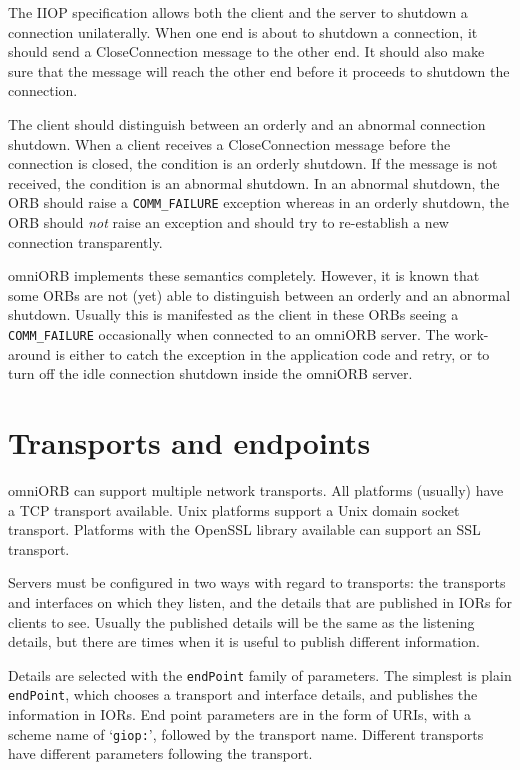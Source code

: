 \documentclass[11pt,twoside,a4paper]{book}
\newcommand{\code}[1]{\texttt{#1}}
\begin{document}
The IIOP specification allows both the client and the server to
shutdown a connection unilaterally. When one end is about to shutdown
a connection, it should send a CloseConnection message to the other
end. It should also make sure that the message will reach the other
end before it proceeds to shutdown the connection.

The client should distinguish between an orderly and an abnormal
connection shutdown. When a client receives a CloseConnection message
before the connection is closed, the condition is an orderly shutdown.
If the message is not received, the condition is an abnormal shutdown.
In an abnormal shutdown, the ORB should raise a \code{COMM\_FAILURE}
exception whereas in an orderly shutdown, the ORB should \emph{not}
raise an exception and should try to re-establish a new connection
transparently.

omniORB implements these semantics completely. However, it is known
that some ORBs are not (yet) able to distinguish between an orderly
and an abnormal shutdown. Usually this is manifested as the client in
these ORBs seeing a \code{COMM\_FAILURE} occasionally when connected
to an omniORB server. The work-around is either to catch the exception
in the application code and retry, or to turn off the idle connection
shutdown inside the omniORB server.



\section{Transports and endpoints}

omniORB can support multiple network transports. All platforms
(usually) have a TCP transport available. Unix platforms support a
Unix domain socket transport. Platforms with the OpenSSL library
available can support an SSL transport.

Servers must be configured in two ways with regard to transports: the
transports and interfaces on which they listen, and the details that
are published in IORs for clients to see. Usually the published
details will be the same as the listening details, but there are times
when it is useful to publish different information.

Details are selected with the \code{endPoint} family of parameters.
The simplest is plain \code{endPoint}, which chooses a transport and
interface details, and publishes the information in IORs. End point
parameters are in the form of URIs, with a scheme name of
`\code{giop:}', followed by the transport name. Different transports
have different parameters following the transport.
\end{document}
